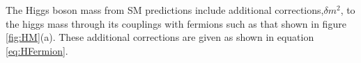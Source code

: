 
The Higgs boson mass from SM predictions include additional corrections,$\delta m^{2}$, to the higgs mass through its couplings with fermions such as that shown in figure \ref{fig:HM}(a). These additional corrections are given as shown in equation \ref{eq:HFermion}.

